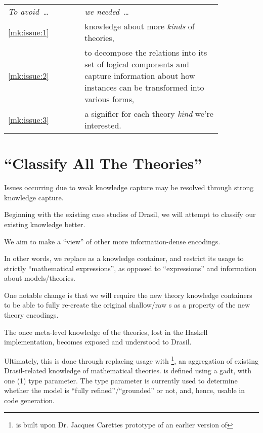 \begin{longtable}[c]{>{\raggedright}p{0.3\linewidth}>{\raggedright\arraybackslash}p{0.54\linewidth}}
    \textit{To avoid~\ldots{}} & \textit{we needed~\ldots{}}                                    \\
    \ref{mk:issue:1}              & knowledge about more \textit{kinds} of theories,            \\
    \ref{mk:issue:2}              & to decompose the relations into its set of
    logical components and capture information about how instances can be
    transformed into various forms,                                                             \\
    \ref{mk:issue:3}              & a signifier for each theory \textit{kind} we're interested. \\
\end{longtable}








\section{\textquotedblleft{}Classify All The Theories\textquotedblright{}}

Issues occurring due to weak knowledge capture may be resolved through strong
knowledge capture.

Beginning with the existing case studies of Drasil, we will attempt to classify
our existing knowledge better.

We aim to make \RelationConcept{} a ``view'' of other more information-dense
encodings.

In other words, we replace \Expr{} as a knowledge container, and restrict its
usage to strictly ``mathematical expressions'', as opposed to ``expressions''
and information about models/theories.

One notable change is that we will require the new theory knowledge containers
to be able to fully re-create the original shallow/raw \Expr{}s as a property of
the new theory encodings.

The once meta-level knowledge of the theories, lost in the Haskell
implementation, becomes exposed and understood to Drasil.

Ultimately, this is done through replacing \RelationConcept{} usage with
\ModelKind{}\footnote{\ModelKind{} is built upon Dr. Jacques Carettes prototype
    of an earlier version of \ModelKinds{}}, an aggregation of existing
Drasil-related knowledge of mathematical theories. \ModelKind{} is defined using
a \acs{gadt}, with one (1) type parameter. The type parameter is currently used
to determine whether the model is ``fully refined''/``grounded'' or not, and,
hence, usable in code generation.

